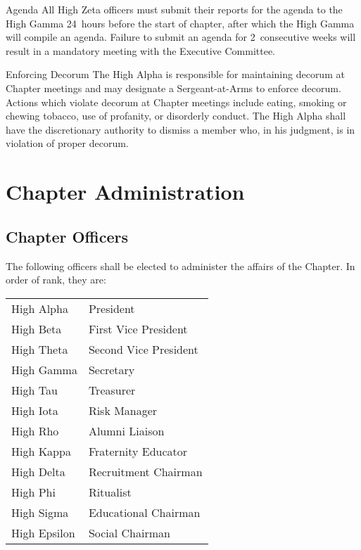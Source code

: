 \documentclass{article}
\begin{document}
\begin{subsubsectionList}
  \item {\titleStyle Agenda\titleSuffix}
  All High Zeta officers must submit their reports for the agenda to the High
  Gamma 24~hours before the start of chapter, after which the High Gamma will
  compile an agenda. Failure to submit an agenda for 2~consecutive weeks will
  result in a mandatory meeting with the Executive Committee.

  \item {\titleStyle Enforcing Decorum\titleSuffix}
  The High Alpha is responsible for maintaining decorum at Chapter meetings and
  may designate a Sergeant-at-Arms to enforce decorum. Actions which violate
  decorum at Chapter meetings include eating, smoking or chewing tobacco, use of
  profanity, or disorderly conduct. The High Alpha shall have the discretionary
  authority to dismiss a member who, in his judgment, is in violation of proper
  decorum.
\end{subsubsectionList}

\section{Chapter Administration}

\subsection{Chapter Officers}

The following officers shall be elected  to administer the affairs of the Chapter. In
order of rank, they are:

\hspace{-\tabcolsep}%
\begin{tabular}{ll}
  High Alpha   & President             \\
  High Beta    & First Vice President  \\
  High Theta   & Second Vice President \\
  High Gamma   & Secretary             \\
  High Tau     & Treasurer             \\
  High Iota    & Risk Manager          \\
  High Rho     & Alumni Liaison        \\
  High Kappa   & Fraternity Educator   \\
  High Delta   & Recruitment Chairman  \\
  High Phi     & Ritualist             \\
  High Sigma   & Educational Chairman  \\
  High Epsilon & Social Chairman       \\
\end{tabular}
\end{document}
